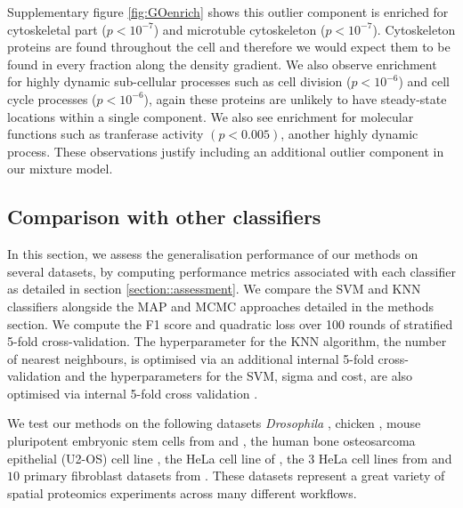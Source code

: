 \documentclass[12pt,english]{article}\usepackage[]{graphicx}\usepackage[]{color}
\begin{document}
Supplementary figure \ref{fig:GOenrich} shows this outlier component
is enriched for cytoskeletal part ($p <10^{-7}$) and microtuble
cytoskeleton ($p <10^{-7}$). Cytoskeleton proteins are found
throughout the cell and therefore we would expect them to be found in
every fraction along the density gradient. We also observe enrichment
for highly dynamic sub-cellular processes such as cell division
($p <10^{-6}$) and cell cycle processes ($p <10^{-6}$), again these
proteins are unlikely to have steady-state locations within a single
component. We also see enrichment for molecular functions such as
tranferase activity $(p < 0.005)$, another highly dynamic
process. These observations justify including an additional outlier
component in our mixture model.


\clearpage

\subsection{Comparison with other classifiers}

In this section, we assess the generalisation performance of our
methods on several datasets, by computing performance metrics
associated with each classifier as detailed in section
\ref{section::assessment}. We compare the SVM and KNN classifiers
alongside the MAP and MCMC approaches detailed in the methods
section. We compute the F1 score and quadratic loss over 100 rounds of
stratified 5-fold cross-validation. The hyperparameter for the KNN
algorithm, the number of nearest neighbours, is optimised via an
additional internal 5-fold cross-validation and the hyperparameters
for the SVM, sigma and cost, are also optimised via internal 5-fold
cross validation \cite{svm:2010}.

We test our methods on the following datasets \textit{Drosophila}
\citep{Tan:2009}, chicken \citep{hall:2009}, mouse pluripotent
embryonic stem cells from \cite{hyper} and \cite{Breckels:2016}, the
human bone osteosarcoma epithelial (U2-OS) cell line
\citep{Thul:2017}, the HeLa cell line of \cite{Itzhak:2016}, the $3$
HeLa cell lines from \cite{Hirst:2018} and $10$ primary fibroblast
datasets from \cite{Jean_Beltran:2016}.  These datasets represent a
great variety of spatial proteomics experiments across many different
workflows.
\end{document}
